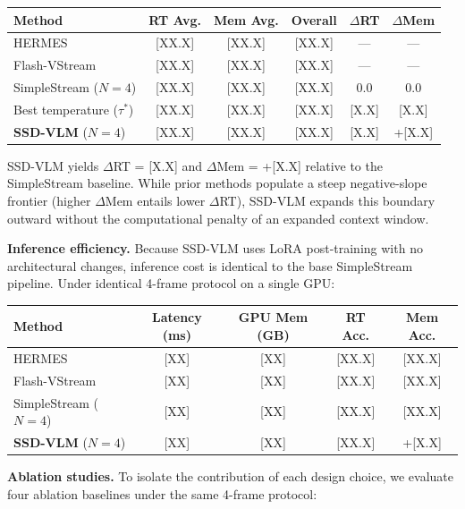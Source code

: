 \documentclass[11pt,a4paper]{article}
\begin{document}
\begin{center}
\small
\begin{tabular}{lccccc}
\toprule
Method & RT Avg. & Mem Avg. & Overall & $\Delta$RT & $\Delta$Mem \\
\midrule
HERMES & [XX.X] & [XX.X] & [XX.X] & --- & --- \\
Flash-VStream & [XX.X] & [XX.X] & [XX.X] & --- & --- \\
SimpleStream ($N\!=\!4$) & [XX.X] & [XX.X] & [XX.X] & 0.0 & 0.0 \\
Best temperature ($\tau^*$) & [XX.X] & [XX.X] & [XX.X] & [X.X] & [X.X] \\
\textbf{SSD-VLM} ($N\!=\!4$) & [XX.X] & [XX.X] & [XX.X] & [X.X] & +[X.X] \\
\bottomrule
\end{tabular}
\end{center}

SSD-VLM yields $\Delta$RT = [X.X] and $\Delta$Mem = +[X.X] relative to the SimpleStream baseline. While prior methods populate a steep negative-slope frontier (higher $\Delta$Mem entails lower $\Delta$RT), SSD-VLM expands this boundary outward without the computational penalty of an expanded context window.

\textbf{Inference efficiency.} Because SSD-VLM uses LoRA post-training with no architectural changes, inference cost is identical to the base SimpleStream pipeline. Under identical 4-frame protocol on a single GPU:

\begin{center}
\small
\begin{tabular}{lcccc}
\toprule
Method & Latency (ms) & GPU Mem (GB) & RT Acc. & Mem Acc. \\
\midrule
HERMES & [XX] & [XX] & [XX.X] & [XX.X] \\
Flash-VStream & [XX] & [XX] & [XX.X] & [XX.X] \\
SimpleStream ($N\!=\!4$) & [XX] & [XX] & [XX.X] & [XX.X] \\
\textbf{SSD-VLM} ($N\!=\!4$) & [XX] & [XX] & [XX.X] & +[X.X] \\
\bottomrule
\end{tabular}
\end{center}

\textbf{Ablation studies.} To isolate the contribution of each design choice, we evaluate four ablation baselines under the same 4-frame protocol:
\end{document}
